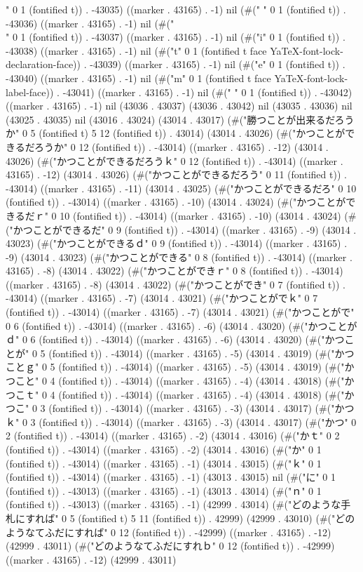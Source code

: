 " 0 1 (fontified t)) . -43035) ((marker . 43165) . -1) nil (#(" " 0 1 (fontified t)) . -43036) ((marker . 43165) . -1) nil (#("\\" 0 1 (fontified t)) . -43037) ((marker . 43165) . -1) nil (#("i" 0 1 (fontified t)) . -43038) ((marker . 43165) . -1) nil (#("t" 0 1 (fontified t face YaTeX-font-lock-declaration-face)) . -43039) ((marker . 43165) . -1) nil (#("e" 0 1 (fontified t)) . -43040) ((marker . 43165) . -1) nil (#("m" 0 1 (fontified t face YaTeX-font-lock-label-face)) . -43041) ((marker . 43165) . -1) nil (#(" " 0 1 (fontified t)) . -43042) ((marker . 43165) . -1) nil (43036 . 43037) (43036 . 43042) nil (43035 . 43036) nil (43025 . 43035) nil (43016 . 43024) (43014 . 43017) (#("勝つことが出来るだろうか" 0 5 (fontified t) 5 12 (fontified t)) . 43014) (43014 . 43026) (#("かつことができるだろうか" 0 12 (fontified t)) . -43014) ((marker . 43165) . -12) (43014 . 43026) (#("かつことができるだろうｋ" 0 12 (fontified t)) . -43014) ((marker . 43165) . -12) (43014 . 43026) (#("かつことができるだろう" 0 11 (fontified t)) . -43014) ((marker . 43165) . -11) (43014 . 43025) (#("かつことができるだろ" 0 10 (fontified t)) . -43014) ((marker . 43165) . -10) (43014 . 43024) (#("かつことができるだｒ" 0 10 (fontified t)) . -43014) ((marker . 43165) . -10) (43014 . 43024) (#("かつことができるだ" 0 9 (fontified t)) . -43014) ((marker . 43165) . -9) (43014 . 43023) (#("かつことができるｄ" 0 9 (fontified t)) . -43014) ((marker . 43165) . -9) (43014 . 43023) (#("かつことができる" 0 8 (fontified t)) . -43014) ((marker . 43165) . -8) (43014 . 43022) (#("かつことができｒ" 0 8 (fontified t)) . -43014) ((marker . 43165) . -8) (43014 . 43022) (#("かつことができ" 0 7 (fontified t)) . -43014) ((marker . 43165) . -7) (43014 . 43021) (#("かつことがでｋ" 0 7 (fontified t)) . -43014) ((marker . 43165) . -7) (43014 . 43021) (#("かつことがで" 0 6 (fontified t)) . -43014) ((marker . 43165) . -6) (43014 . 43020) (#("かつことがｄ" 0 6 (fontified t)) . -43014) ((marker . 43165) . -6) (43014 . 43020) (#("かつことが" 0 5 (fontified t)) . -43014) ((marker . 43165) . -5) (43014 . 43019) (#("かつことｇ" 0 5 (fontified t)) . -43014) ((marker . 43165) . -5) (43014 . 43019) (#("かつこと" 0 4 (fontified t)) . -43014) ((marker . 43165) . -4) (43014 . 43018) (#("かつこｔ" 0 4 (fontified t)) . -43014) ((marker . 43165) . -4) (43014 . 43018) (#("かつこ" 0 3 (fontified t)) . -43014) ((marker . 43165) . -3) (43014 . 43017) (#("かつｋ" 0 3 (fontified t)) . -43014) ((marker . 43165) . -3) (43014 . 43017) (#("かつ" 0 2 (fontified t)) . -43014) ((marker . 43165) . -2) (43014 . 43016) (#("かｔ" 0 2 (fontified t)) . -43014) ((marker . 43165) . -2) (43014 . 43016) (#("か" 0 1 (fontified t)) . -43014) ((marker . 43165) . -1) (43014 . 43015) (#("ｋ" 0 1 (fontified t)) . -43014) ((marker . 43165) . -1) (43013 . 43015) nil (#("に" 0 1 (fontified t)) . -43013) ((marker . 43165) . -1) (43013 . 43014) (#("ｎ" 0 1 (fontified t)) . -43013) ((marker . 43165) . -1) (42999 . 43014) (#("どのような手札にすれば" 0 5 (fontified t) 5 11 (fontified t)) . 42999) (42999 . 43010) (#("どのようなてふだにすれば" 0 12 (fontified t)) . -42999) ((marker . 43165) . -12) (42999 . 43011) (#("どのようなてふだにすれｂ" 0 12 (fontified t)) . -42999) ((marker . 43165) . -12) (42999 . 43011) 